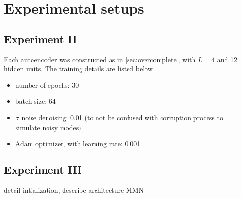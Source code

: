 \chapter{Experimental setups}\label{exp-setup} 

\section{Experiment II}\label{sec:setup-expII}
Each autoencoder was constructed as in \ref{sec:overcomplete}, with $L=4$ and 12 hidden units. The training details are listed below
\begin{itemize}
\item number of epochs: 30
\item batch size: 64
\item $\sigma$ noise denoising: 0.01 (to not be confused with corruption process to simulate noisy modes)
\item Adam optimizer, with learning rate: 0.001
\end{itemize}

\section{Experiment III}\label{sec:setup-expIII}
detail intialization, describe architecture MMN
